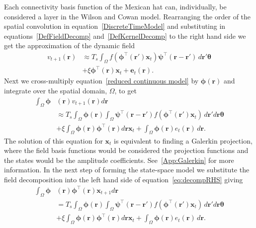 \documentclass[review,authoryear,3p]{elsarticle}
\begin{document}
Each connectivity basis function of the Mexican hat can, individually, be considered a layer in the Wilson and Cowan model. Rearranging the order of the spatial convolution in equation~\ref{DiscreteTimeModel} and substituting in equations~\ref{DefFieldDecomp} and~\ref{DefKernelDecomp} to the right hand side we get the approximation of the dynamic field
\begin{align}
	\label{reduced continuous model}
	v_{t+1}\left(\mathbf{r}\right) &\approx T_s\int_\Omega{f(\boldsymbol{\phi}^{\top}(\mathbf{r}')\mathbf{x}_t )\boldsymbol{\psi}^{\top}(\mathbf{r}-\mathbf{r}') \, d\mathbf{r}'}\boldsymbol{\theta} \nonumber \\
	&+ \xi\boldsymbol{\phi}^{\top}(\mathbf{r})\mathbf{x}_t + \mathbf{e}_t(\mathbf{r}). 
\end{align}
Next we cross-multiply equation~\ref{reduced continuous model} by $\boldsymbol{\phi}(\mathbf{r})$ and integrate over the spatial domain, $\Omega$, to get 
\begin{align}
	\label{eq:decompRHS}
 	\int_\Omega \boldsymbol{\phi}&\left(\mathbf{r}\right) v_{t+1}\left(\mathbf{r}\right)d\mathbf{r}  \nonumber \\
	&\approx T_s \int_\Omega \boldsymbol{\phi} (\mathbf{r}) \int_\Omega \boldsymbol{\psi}^{\top} (\mathbf{r}-\mathbf{r}') f(\boldsymbol{\phi}^{\top}(\mathbf{r}') \mathbf{x}_t ) \, d\mathbf{r}'d\mathbf{r}\boldsymbol{\theta} \nonumber \\ 
	&+ \xi\int_\Omega {\boldsymbol{\phi}(\mathbf{r}) \boldsymbol{\phi}^{\top}(\mathbf{r})d\mathbf{r} } \mathbf{x}_t + \int_\Omega{\boldsymbol{\phi} (\mathbf{r}) e_t(\mathbf{r}) \, d\mathbf{r}}. 
\end{align}
The solution of this equation for $\mathbf{x}_t$ is equivalent to finding a Galerkin projection, where the field basis functions would be considered the projection functions and the states would be the amplitude coefficients. See~\ref{App:Galerkin} for more information. In the next step of forming the state-space model we substitute the field decomposition into the left hand side of equation~\ref{eq:decompRHS} giving
\begin{align}
	\label{eq:StartofReduction}
 	\int_\Omega \boldsymbol{\phi}&\left(\mathbf{r}\right) \boldsymbol{\phi}^{\top}\left(\mathbf{r}\right)\mathbf{x}_{t+1}d\mathbf{r}  \nonumber \\
	&= T_s \int_\Omega \boldsymbol{\phi} (\mathbf{r}) \int_\Omega \boldsymbol{\psi}^{\top} (\mathbf{r}-\mathbf{r}') f(\boldsymbol{\phi}^{\top}(\mathbf{r}') \mathbf{x}_t ) \, d\mathbf{r}'d\mathbf{r}\boldsymbol{\theta} \nonumber \\ 
	&+ \xi\int_\Omega {\boldsymbol{\phi}(\mathbf{r}) \boldsymbol{\phi}^{\top}(\mathbf{r})d\mathbf{r} } \mathbf{x}_t + \int_\Omega{\boldsymbol{\phi} (\mathbf{r}) e_t(\mathbf{r}) \, d\mathbf{r}}. 
\end{align}
\end{document}
